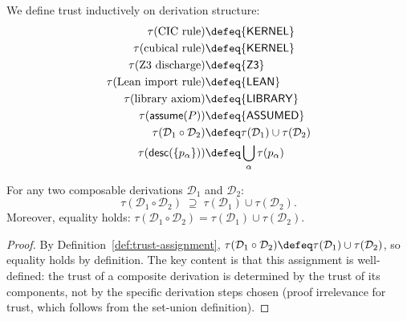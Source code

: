\begin{definition}
\label{def:trust-assignment}
We define trust inductively on derivation structure:
\begin{align*}
  \tau(\text{CIC rule}) &\defeq \{\mathsf{KERNEL}\} \\
  \tau(\text{cubical rule}) &\defeq \{\mathsf{KERNEL}\} \\
  \tau(\text{Z3 discharge}) &\defeq \{\mathsf{Z3}\} \\
  \tau(\text{Lean import rule}) &\defeq \{\mathsf{LEAN}\} \\
  \tau(\text{library axiom}) &\defeq \{\mathsf{LIBRARY}\} \\
  \tau(\mathsf{assume}(P)) &\defeq \{\mathsf{ASSUMED}\} \\
  \tau(\mathcal{D}_1 \circ \mathcal{D}_2) &\defeq
    \tau(\mathcal{D}_1) \cup \tau(\mathcal{D}_2) \\
  \tau(\mathsf{desc}(\{p_\alpha\})) &\defeq
    \bigcup_\alpha \tau(p_\alpha)
\end{align*}
\end{definition}

\begin{theorem}
\label{thm:trust-monotone}
For any two composable derivations $\mathcal{D}_1$ and $\mathcal{D}_2$:
\[
  \tau(\mathcal{D}_1 \circ \mathcal{D}_2)
  \;\supseteq\;
  \tau(\mathcal{D}_1) \cup \tau(\mathcal{D}_2).
\]
Moreover, equality holds: $\tau(\mathcal{D}_1 \circ \mathcal{D}_2) =
\tau(\mathcal{D}_1) \cup \tau(\mathcal{D}_2)$.
\end{theorem}

\begin{proof}
By Definition~\ref{def:trust-assignment}, $\tau(\mathcal{D}_1 \circ \mathcal{D}_2) \defeq
\tau(\mathcal{D}_1) \cup \tau(\mathcal{D}_2)$, so equality holds by definition.
The key content is that this assignment is well-defined: the trust of a composite
derivation is determined by the trust of its components, not by the
specific derivation steps chosen (proof irrelevance for trust, which
follows from the set-union definition).
\end{proof}

